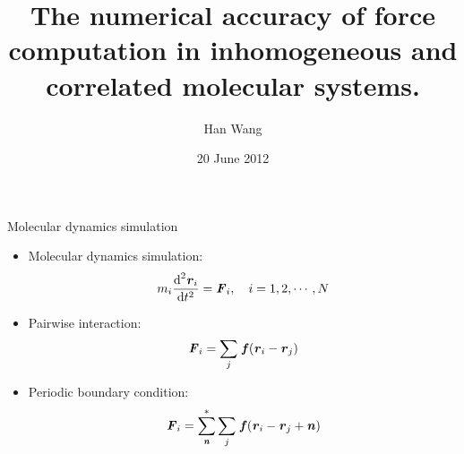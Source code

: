\documentclass{beamer}
\newcommand{\redc}[1]{{\color{red} #1}}
\newcommand{\bluec}[1]{{\color{blue} #1}}
\renewcommand{\v}[1]{\textbf{\textit{#1}}}
\renewcommand{\d}[1]{\textrm{#1}}
\begin{document}
\title[]{
  The numerical accuracy of force computation in inhomogeneous and correlated molecular systems.
}
%
\author{Han Wang}
\date[20 June 2012]{20 June 2012}
\frame{\titlepage}


\begin{frame}{Molecular dynamics simulation}
  \begin{itemize}\itemsep -10pt
  \item<1-> Molecular dynamics simulation:
    \bluec{
      \begin{align*}
        m_i \frac{\d d^2\v r_i}{\d dt^2} = \v F_i, \quad i = 1, 2, \cdots, N
      \end{align*}
    }
  \item<2-> Pairwise interaction:
    \bluec{
      \begin{align*}
        \v F_i = \sum_{j}\, \v f(\v r_i - \v r_j)
      \end{align*}}
  \item<3-> Periodic boundary condition:
    \bluec{
      \begin{align*}
        \v F_i = \sum_{\v n}^\ast\sum_{j}\, \v f(\v r_i - \v r_j + \v n)
      \end{align*}}
  \end{itemize}
\end{frame}
\end{document}

